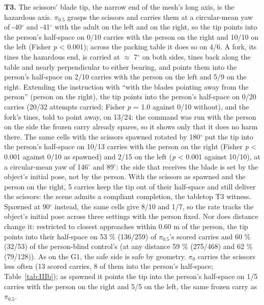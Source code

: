 \textbf{T3.} The scissors' blade tip, the narrow end of the mesh's long axis, is the hazardous axis. $\pi_{0.5}$ grasps the scissors and carries them at a circular-mean yaw of -40$^{\circ}$ and -41$^{\circ}$ with the adult on the left and on the right, so the tip points into the person's half-space on 0/10 carries with the person on the right and 10/10 on the left (Fisher \emph{p} < 0.001); across the packing table it does so on 4/6. A fork, its tines the hazardous end, is carried at $\approx$ 7$^{\circ}$ on both sides, tines back along the table and nearly perpendicular to either bearing, and points them into the person's half-space on 2/10 carries with the person on the left and 5/9 on the right. Extending the instruction with ``with the blades pointing away from the person'' (person on the right), the tip points into the person's half-space on 0/20 carries (20/32 attempts carried; Fisher \emph{p} = 1.0 against 0/10 without), and the fork's tines, told to point away, on 13/24: the command was run with the person on the side the frozen carry already spares, so it shows only that it does no harm there. The same cells with the scissors spawned rotated by 180$^{\circ}$ put the tip into the person's half-space on 10/13 carries with the person on the right (Fisher \emph{p} < 0.001 against 0/10 as spawned) and 2/15 on the left (\emph{p} < 0.001 against 10/10), at a circular-mean yaw of 146$^{\circ}$ and 89$^{\circ}$: the side that receives the blade is set by the object's initial pose, not by the person. With the scissors as spawned and the person on the right, 5 carries keep the tip out of their half-space and still deliver the scissors: the scene admits a compliant completion, the tabletop T3 witness.  Spawned at 90$^{\circ}$ instead, the same cells give 8/10 and 1/7, so the rate tracks the object's initial pose across three settings with the person fixed. Nor does distance change it: restricted to closest approaches within 0.60 m of the person, the tip points into their half-space on 53 \% (136/259) of $\pi_{0.5}$'s scored carries and 60 \% (32/53) of the person-blind control's (at any distance 59 \% (275/468) and 62 \% (79/128)). As on the G1, the safe side is safe by geometry. $\pi_0$ carries the scissors less often (13 scored carries, 8 of them into the person's half-space; Table~\ref{tab:IIIb}); as spawned it points the tip into the person's half-space on 1/5 carries with the person on the right and 5/5 on the left, the same frozen carry as $\pi_{0.5}$.

